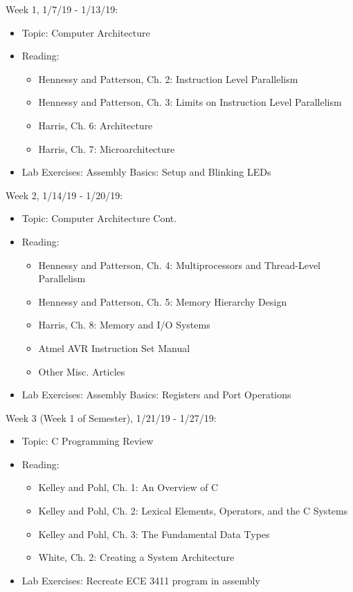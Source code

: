 \documentclass[12pt,a4paper,oneside,notitlepage]{article}
\begin{document}
\noindent 
Week 1, 1/7/19 - 1/13/19:
\begin{itemize}
\item Topic: Computer Architecture
\item Reading: 
	\begin{itemize}
		\item Hennessy and Patterson, Ch. 2: Instruction Level Parallelism
		\item Hennessy and Patterson, Ch. 3: Limits on Instruction Level Parallelism
		\item Harris, Ch. 6: Architecture
		\item Harris, Ch. 7: Microarchitecture
	\end{itemize}
\item Lab Exercises: Assembly Basics: Setup and Blinking LEDs
\end{itemize}
Week 2, 1/14/19 - 1/20/19:
\begin{itemize}
\item Topic: Computer Architecture Cont.
\item Reading:
	\begin{itemize}
		\item Hennessy and Patterson, Ch. 4: Multiprocessors and Thread-Level Parallelism
		\item Hennessy and Patterson, Ch. 5: Memory Hierarchy Design
		\item Harris, Ch. 8: Memory and I/O Systems
		\item Atmel AVR Instruction Set Manual
		\item Other Misc. Articles
	\end{itemize}
\item Lab Exercises: Assembly Basics: Registers and Port Operations
\end{itemize}
Week 3 (Week 1 of Semester), 1/21/19 - 1/27/19:
\begin{itemize}
\item Topic: C Programming Review
\item Reading:
	\begin{itemize}
		\item Kelley and Pohl, Ch. 1: An Overview of C
		\item Kelley and Pohl, Ch. 2: Lexical Elements, Operators, and the C Systems
		\item Kelley and Pohl, Ch. 3: The Fundamental Data Types
		\item White, Ch. 2: Creating a System Architecture
	\end{itemize}
\item Lab Exercises: Recreate ECE 3411 program in assembly
\end{itemize}
\end{document}
